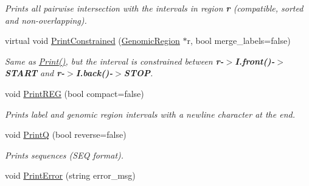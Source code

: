 \begin{CompactItemize}
\begin{CompactList}\small\item\em Prints all pairwise intersection with the intervals in region {\bf r} (compatible, sorted and non-overlapping). \item\end{CompactList}\item 
\hypertarget{classGenomicRegion_cfe5347d9c92da801ce7e97416fc8758}{
virtual void \hyperlink{classGenomicRegion_cfe5347d9c92da801ce7e97416fc8758}{PrintConstrained} (\hyperlink{classGenomicRegion}{GenomicRegion} $\ast$r, bool merge\_\-labels=false)}
\label{classGenomicRegion_cfe5347d9c92da801ce7e97416fc8758}

\begin{CompactList}\small\item\em Same as \hyperlink{classGenomicRegion_40397d1fab7b00e5f04b9f7e52f0114e}{Print()}, but the interval is constrained between {\bf r-$>$I.front()-$>$START} and {\bf r-$>$I.back()-$>$STOP}. \item\end{CompactList}\item 
\hypertarget{classGenomicRegion_9c687565a8ed25da5a5ccf08e5e8461e}{
void \hyperlink{classGenomicRegion_9c687565a8ed25da5a5ccf08e5e8461e}{PrintREG} (bool compact=false)}
\label{classGenomicRegion_9c687565a8ed25da5a5ccf08e5e8461e}

\begin{CompactList}\small\item\em Prints label and genomic region intervals with a newline character at the end. \item\end{CompactList}\item 
\hypertarget{classGenomicRegion_9a00b031d4a119181b8b76ffa34a6f47}{
void \hyperlink{classGenomicRegion_9a00b031d4a119181b8b76ffa34a6f47}{PrintQ} (bool reverse=false)}
\label{classGenomicRegion_9a00b031d4a119181b8b76ffa34a6f47}

\begin{CompactList}\small\item\em Prints sequences (SEQ format). \item\end{CompactList}\item 
\hypertarget{classGenomicRegion_68ecc1c8c76e9204f6e27801f0ba3d5f}{
void \hyperlink{classGenomicRegion_68ecc1c8c76e9204f6e27801f0ba3d5f}{PrintError} (string error\_\-msg)}
\label{classGenomicRegion_68ecc1c8c76e9204f6e27801f0ba3d5f}


\end{CompactItemize}
